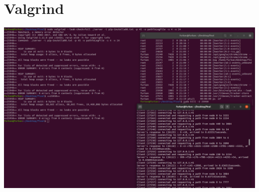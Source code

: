 \documentclass{article}
\begin{document}
\section{Valgrind}

\includegraphics[width=\textwidth]{10.png} \newline
\end{document}
